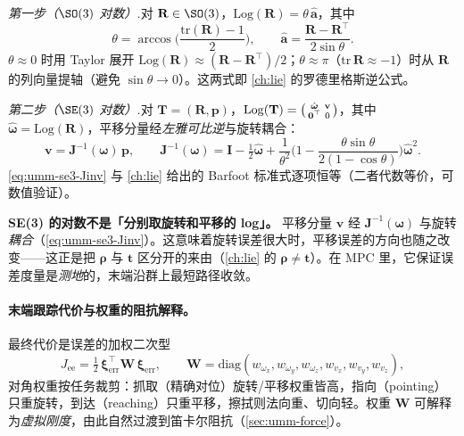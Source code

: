 \begin{derivation}[SE(3) 对数映射]
\emph{第一步（$\SO(3)$ 对数）.}\;对 $\mathbf R\in\SO(3)$，$\mathrm{Log}(\mathbf R)=\theta\,\hat{\mathbf a}$，其中
\begin{equation}
  \theta=\arccos\!\Big(\frac{\mathrm{tr}(\mathbf R)-1}{2}\Big),\qquad
  \hat{\mathbf a}=\frac{\mathbf R-\mathbf R^\top}{2\sin\theta}.
  \label{eq:umm-so3-log}
\end{equation}
$\theta\approx0$ 时用 Taylor 展开 $\mathrm{Log}(\mathbf R)\approx(\mathbf R-\mathbf R^\top)/2$；$\theta\approx\pi$（$\mathrm{tr}\,\mathbf R\approx-1$）时从 $\mathbf R$ 的列向量提轴（避免 $\sin\theta\to0$）。这两式即 \cref{ch:lie} 的罗德里格斯逆公式。

\emph{第二步（$\SE(3)$ 对数）.}\;对 $\mathbf T=(\mathbf R,\mathbf p)$，$\mathrm{Log}(\mathbf T)=\begin{psmallmatrix}\hat{\boldsymbol\omega}&\mathbf v\\ \mathbf 0^\top&0\end{psmallmatrix}$，其中 $\hat{\boldsymbol\omega}=\mathrm{Log}(\mathbf R)$，平移分量经\emph{左雅可比逆}与旋转耦合：
\begin{equation}
  \mathbf v=\mathbf J^{-1}(\boldsymbol\omega)\,\mathbf p,\qquad
  \mathbf J^{-1}(\boldsymbol\omega)=\mathbf I-\tfrac12\hat{\boldsymbol\omega}+\frac1{\theta^2}\Big(1-\frac{\theta\sin\theta}{2(1-\cos\theta)}\Big)\hat{\boldsymbol\omega}^2.
  \label{eq:umm-se3-Jinv}
\end{equation}
\cref{eq:umm-se3-Jinv} 与 \cref{ch:lie} 给出的 Barfoot 标准式逐项恒等（二者代数等价，可数值验证）。
\end{derivation}

\begin{insight}
\textbf{SE(3) 的对数不是「分别取旋转和平移的 log」。}\;
平移分量 $\mathbf v$ 经 $\mathbf J^{-1}(\boldsymbol\omega)$ 与旋转\emph{耦合}（\cref{eq:umm-se3-Jinv}）。这意味着旋转误差很大时，平移误差的方向也随之改变——这正是把 $\boldsymbol\rho$ 与 $\mathbf t$ 区分开的来由（\cref{ch:lie} 的 $\boldsymbol\rho\neq\mathbf t$）。在 MPC 里，它保证误差度量是\emph{测地}的，末端沿群上最短路径收敛。
\end{insight}

\paragraph{末端跟踪代价与权重的阻抗解释。}
最终代价是误差的加权二次型
\begin{equation}
  J_{\text{ee}}=\tfrac12\,\boldsymbol\xi_{\text{err}}^\top\mathbf W\,\boldsymbol\xi_{\text{err}},
  \qquad \mathbf W=\mathrm{diag}(w_{\omega_x},w_{\omega_y},w_{\omega_z},w_{v_x},w_{v_y},w_{v_z}),
  \label{eq:umm-Jee}
\end{equation}
对角权重按任务裁剪：抓取（精确对位）旋转/平移权重皆高，指向（pointing）只重旋转，到达（reaching）只重平移，擦拭则法向重、切向轻。权重 $\mathbf W$ 可解释为\emph{虚拟刚度}，由此自然过渡到笛卡尔阻抗（\cref{sec:umm-force}）。

